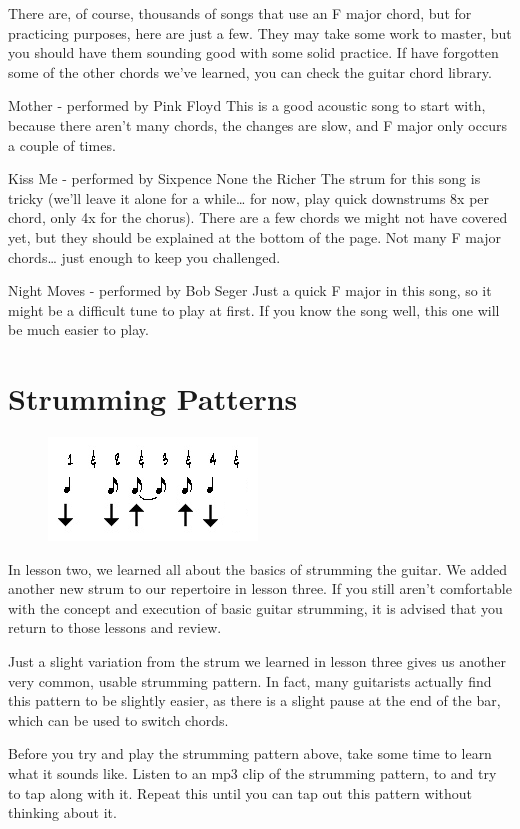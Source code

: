 There are, of course, thousands of songs that use an F major chord, but for
practicing purposes, here are just a few. They may take some work to master,
but you should have them sounding good with some solid practice. If have
forgotten some of the other chords we've learned, you can check the guitar
chord library.

Mother - performed by Pink Floyd
This is a good acoustic song to start with, because there aren't many chords,
the changes are slow, and F major only occurs a couple of times.

Kiss Me - performed by Sixpence None the Richer
The strum for this song is tricky (we'll leave it alone for a while\ldots{} for now,
play quick downstrums 8x per chord, only 4x for the chorus). There are a few
chords we might not have covered yet, but they should be explained at the
bottom of the page. Not many F major chords\ldots{} just enough to keep you
challenged.

Night Moves - performed by Bob Seger
Just a quick F major in this song, so it might be a difficult tune to play at
first. If you know the song well, this one will be much easier to play. 

\section{Strumming Patterns}
\begin{figure}
\includegraphics{partfour/strum4.png}
\end{figure}

In lesson two, we learned all about the basics of strumming the guitar. We
added another new strum to our repertoire in lesson three. If you still aren't
comfortable with the concept and execution of basic guitar strumming, it is
advised that you return to those lessons and review.

Just a slight variation from the strum we learned in lesson three gives us
another very common, usable strumming pattern. In fact, many guitarists
actually find this pattern to be slightly easier, as there is a slight pause at
the end of the bar, which can be used to switch chords.

Before you try and play the strumming pattern above, take some time to learn
what it sounds like. Listen to an mp3 clip of the strumming pattern, to and try
to tap along with it. Repeat this until you can tap out this pattern without
thinking about it.

